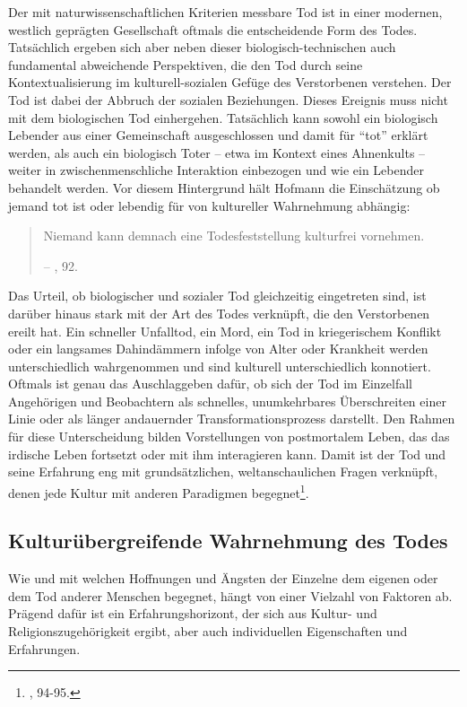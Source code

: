 \documentclass[openany,twoside,twocolumn]{book}
\let\rmarkdownfootnote\footnote%
\def\footnote{\protect\rmarkdownfootnote}
\begin{document}
Der mit naturwissenschaftlichen Kriterien messbare Tod ist in einer
modernen, westlich geprägten Gesellschaft oftmals die entscheidende Form
des Todes. Tatsächlich ergeben sich aber neben dieser
biologisch-technischen auch fundamental abweichende Perspektiven, die
den Tod durch seine Kontextualisierung im kulturell-sozialen Gefüge des
Verstorbenen verstehen. Der Tod ist dabei der Abbruch der sozialen
Beziehungen. Dieses Ereignis muss nicht mit dem biologischen Tod
einhergehen. Tatsächlich kann sowohl ein biologisch Lebender aus einer
Gemeinschaft ausgeschlossen und damit für ``tot'' erklärt werden, als
auch ein biologisch Toter -- etwa im Kontext eines Ahnenkults -- weiter
in zwischenmenschliche Interaktion einbezogen und wie ein Lebender
behandelt werden. Vor diesem Hintergrund hält Hofmann die Einschätzung
ob jemand tot ist oder lebendig für von kultureller Wahrnehmung
abhängig:

\begin{quote}
Niemand kann demnach eine Todesfeststellung kulturfrei vornehmen.

-- \textcite{hofmann_rituelle_2008}, 92.
\end{quote}

Das Urteil, ob biologischer und sozialer Tod gleichzeitig eingetreten
sind, ist darüber hinaus stark mit der Art des Todes verknüpft, die den
Verstorbenen ereilt hat. Ein schneller Unfalltod, ein Mord, ein Tod in
kriegerischem Konflikt oder ein langsames Dahindämmern infolge von Alter
oder Krankheit werden unterschiedlich wahrgenommen und sind kulturell
unterschiedlich konnotiert. Oftmals ist genau das Auschlaggeben dafür,
ob sich der Tod im Einzelfall Angehörigen und Beobachtern als schnelles,
unumkehrbares Überschreiten einer Linie oder als länger andauernder
Transformationsprozess darstellt. Den Rahmen für diese Unterscheidung
bilden Vorstellungen von postmortalem Leben, das das irdische Leben
fortsetzt oder mit ihm interagieren kann. Damit ist der Tod und seine
Erfahrung eng mit grundsätzlichen, weltanschaulichen Fragen verknüpft,
denen jede Kultur mit anderen Paradigmen begegnet\footnote{\textcite{hofmann_rituelle_2008},
  94-95.}.

\hypertarget{kulturubergreifende-wahrnehmung-des-todes}{%
\subsection{Kulturübergreifende Wahrnehmung des
Todes}\label{kulturubergreifende-wahrnehmung-des-todes}}

Wie und mit welchen Hoffnungen und Ängsten der Einzelne dem eigenen oder
dem Tod anderer Menschen begegnet, hängt von einer Vielzahl von Faktoren
ab. Prägend dafür ist ein Erfahrungshorizont, der sich aus Kultur- und
Religionszugehörigkeit ergibt, aber auch individuellen Eigenschaften und
Erfahrungen.
\end{document}
